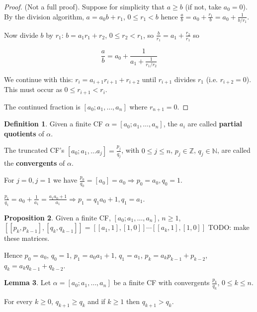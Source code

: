 \documentclass[12pt,a4paper]{article}
\theoremstyle{definition}
\newtheorem{definition}{Definition}[subsection]
\newtheorem{proposition}[definition]{Proposition}
\newtheorem{lemma}[definition]{Lemma}
\begin{document}
\begin{proof}
	(Not a full proof). Suppose for simplicity that $a \ge b$ (if not, take $a_0 = 0$). By the division algorithm, $a = a_0 b + r_1$, $0 \le r_1 < b$ hence $\frac{a}{b} = a_0 + \frac{r_1}{b} = a_0 + \frac{1}{b / r_1}$.

	Now divide $b$ by $r_1$: $b = a_1 r_1 + r_2$, $0 \le r_2 < r_1$, so $\frac{b}{r_1} = a_1 + \frac{r_2}{r_1}$ so
	
	\[ \frac{a}{b} = a_0 + \frac{1}{a_1 + \frac{1}{r_1 / r_2}} \]

	We continue with this: $r_i = a_{i + 1} r_{i + 1} + r_{i + 2}$ until $r_{i + 1}$ divides $r_1$ (i.e. $r_{i + 2} = 0$). This must occur as $0 \le r_{i + 1} < r_i$.

	The continued fraction is $[a_0; a_1, \ldots, a_n]$ where $r_{n + 1} = 0$.
\end{proof}

\begin{definition}
	Given a finite CF $\alpha = [a_0; a_1, \ldots, a_n]$, the $a_i$ are called \textbf{partial quotients} of $\alpha$.

	The truncated CF's $[a_0; a_1, \ldots a_j] = \frac{p_j}{q_j}$, with $0 \le j \le n$, $p_j \in \mathbb{Z}$, $q_j \in \mathbb{N}$, are called the \textbf{convergents} of $\alpha$.

	For $j = 0, j = 1$ we have $\frac{p_0}{q_0} = [a_0] = a_0 \Rightarrow p_0 = a_0, q_0 = 1$.

	$\frac{p_1}{q_1} = a_0 + \frac{1}{a_1} = \frac{a_1 a_0 + 1}{a_1} \Rightarrow p_1 = q_1 a_0 + 1, q_1 = a_1$.
\end{definition}

\begin{proposition}
	Given a finite CF, $[a_0; a_1, \ldots, a_n]$, $n \ge 1$, $[[p_k, p_{k - 1}], [q_k, q_{k - 1}]] = [[a_1, 1], [1, 0]] \cdots [[a_k, 1], [1, 0]]$ TODO: make these matrices.

	Hence $p_0 = a_0$, $q_0 = 1$, $p_1 = a_0 a_1 + 1$, $q_1 = a_1$, $p_k = a_k p_{k - 1} + p_{k - 2}$, $q_k = a_k q_{k - 1} + q_{k - 2}$.
\end{proposition}

\begin{lemma}
	Let $\alpha = [a_0; a_1, \ldots, a_n]$ be a finite CF with convergents $\frac{p_k}{q_k}$, $0 \le k \le n$.

	For every $k \ge 0$, $q_{k + 1} \ge q_k$ and if $k \ge 1$ then $q_{k + 1} > q_k$.
\end{lemma}
\end{document}
